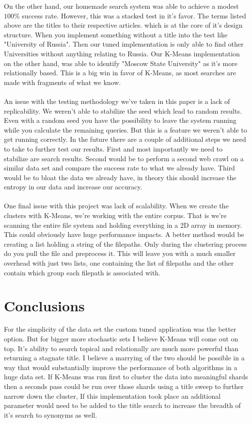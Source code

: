 \documentclass{article}
\begin{document}
On the other hand, our homemade search system was able to achieve a modest $100\%$ success rate. However, this was a stacked test in it's favor. The terms listed above are the titles to their respective articles. which is at the core of it's design structure. When you implement something without a title into the test like "University of Russia". Then our tuned implementation is only able to find other Universities without anything relating to Russia. Our K-Means implementation on the other hand, was able to identify "Moscow State University" as it's more relationally based. This is a big win in favor of K-Means, as most searches are made with fragments of what we know. 
\\\\
An issue with the testing methodology we've taken in this paper is a lack of replicability. We weren't able to stabilize the seed which lead to random results. Even with a random seed you have the possibility to  leave the system running while you calculate the remaining queries. But this is a feature we weren't able to get running correctly. In the future there are a couple of additional steps we need to take to further test our results. First and most importantly we need to stabilize are search results. Second would be to perform a second web crawl on a similar data set and compare the success rate to what we already have. Third would be to bloat the data we already have, in theory this should increase the entropy in our data and increase our accuracy. 
\\\\
One final issue with this project was lack of scalability. When we create the clusters with K-Means, we're working with the entire corpus. That is we're scanning the entire file system and holding everything in a 2D array in memory. This could obviously have huge performance impacts. A better method would be creating a list holding a string of the filepaths. Only during the clustering process do you pull the file and preprocess it. This will leave you with a much smaller overhead with just two lists, one containing the list of filepaths and the other contain which group each filepath is associated with. 

\section{Conclusions}

For the simplicity of the data set the custom tuned application was the better option. But for bigger more stochastic sets I believe K-Means will come out on top. It's ability to search topical and relationally are much more powerful than returning a stagnate title. I believe a marrying of the two should be possible in a way that would substantially improve the performance of both algorithms in a huge data set. If K-Means was run first to cluster the data into meaningful shards then a seconds pass could be run over those shards using a title sweep to further narrow down the cluster, If this implementation took place an additional parameter would need to be added to the title search to increase the breadth of it's search to synonyms as well. 
\end{document}
